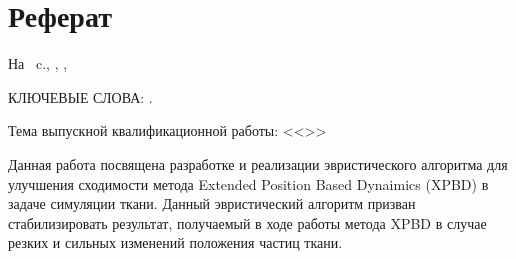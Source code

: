 \chapter*[Count-me]{Реферат} %
\thispagestyle{empty}%
%
%



На ~c.,  
,
,

{\MakeUppercase{Ключевые слова: \keywordsRu}.}%

Тема выпускной квалификационной работы: <<\thesisTitle>>%



Данная работа посвящена разработке и реализации эвристического алгоритма для улучшения сходимости метода Extended Position Based Dynaimics (XPBD) в задаче симуляции ткани. Данный эвристический алгоритм призван стабилизировать результат, получаемый в ходе работы метода XPBD в случае резких и сильных изменений положения частиц ткани.

